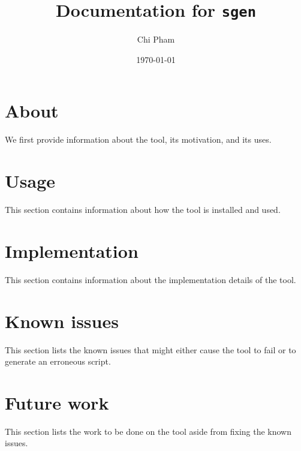 \documentclass[a4paper,11pt]{article}
\title{\textbf{Documentation for \texttt{sgen}}}
\date{\today}
\author{Chi Pham}
\begin{document}
\maketitle
\tableofcontents
\newpage

\section{About}
We first provide information about the tool, its motivation, and its uses.

\clearpage

\section{Usage}
This section contains information about how the tool is installed and used.

\clearpage

\section{Implementation}
This section contains information about the implementation details of the tool.

\clearpage

\section{Known issues}
This section lists the known issues that might either cause the tool to fail or to generate an erroneous script.

\clearpage

\section{Future work}
This section lists the work to be done on the tool aside from fixing the known issues.

\end{document}
